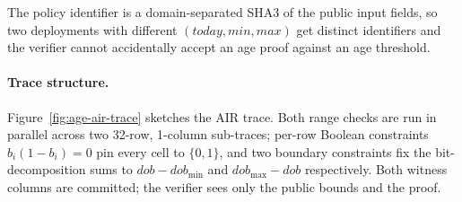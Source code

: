 \documentclass[11pt,a4paper]{article}
\begin{document}
The policy identifier is a
domain\nobreakdash-separated SHA3 of the public input fields, so two
deployments with different $(\mathit{today}, \mathit{min}, \mathit{max})$
get distinct identifiers and the verifier cannot accidentally
accept an age proof against an age
threshold.

\paragraph{Trace structure.}
Figure~\ref{fig:age-air-trace} sketches the AIR trace.  Both range
checks are run in parallel across two 32\nobreakdash-row, 1\nobreakdash-column
sub\nobreakdash-traces; per\nobreakdash-row Boolean constraints
$b_i (1 - b_i) = 0$ pin every cell to $\{0, 1\}$, and two boundary
constraints fix the bit\nobreakdash-decomposition sums to
$\mathit{dob} - \mathit{dob}_\mathrm{min}$ and
$\mathit{dob}_\mathrm{max} - \mathit{dob}$ respectively.  Both
witness columns are committed; the verifier sees only the
public bounds and the proof.
\end{document}
